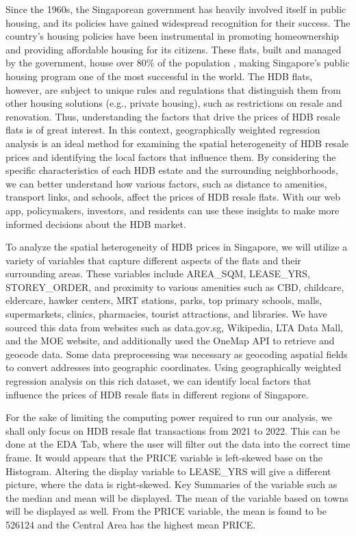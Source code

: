 \documentclass[manuscript,screen]{acmart}
\begin{document}
Since the 1960s, the Singaporean government has heavily involved itself
in public housing, and its policies have gained widespread recognition
for their success. The country's housing policies have been instrumental
in promoting homeownership and providing affordable housing for its
citizens. These flats, built and managed by the government, house over
80\% of the population \citep{Harsh22}, making Singapore's public
housing program one of the most successful in the world. The HDB flats,
however, are subject to unique rules and regulations that distinguish
them from other housing solutions (e.g., private housing), such as
restrictions on resale and renovation. Thus, understanding the factors
that drive the prices of HDB resale flats is of great interest. In this
context, geographically weighted regression analysis is an ideal method
for examining the spatial heterogeneity of HDB resale prices and
identifying the local factors that influence them. By considering the
specific characteristics of each HDB estate and the surrounding
neighborhoods, we can better understand how various factors, such as
distance to amenities, transport links, and schools, affect the prices
of HDB resale flats. With our web app, policymakers, investors, and
residents can use these insights to make more informed decisions about
the HDB market.

To analyze the spatial heterogeneity of HDB prices in Singapore, we will
utilize a variety of variables that capture different aspects of the
flats and their surrounding areas. These variables include AREA\_SQM,
LEASE\_YRS, STOREY\_ORDER, and proximity to various amenities such as
CBD, childcare, eldercare, hawker centers, MRT stations, parks, top
primary schools, malls, supermarkets, clinics, pharmacies, tourist
attractions, and libraries. We have sourced this data from websites such
as data.gov.sg, Wikipedia, LTA Data Mall, and the MOE website, and
additionally used the OneMap API to retrieve and geocode data. Some data
preprocessing was necessary as geocoding aspatial fields to convert
addresses into geographic coordinates. Using geographically weighted
regression analysis on this rich dataset, we can identify local factors
that influence the prices of HDB resale flats in different regions of
Singapore.~

For the sake of limiting the computing power required to run our
analysis, we shall only focus on HDB resale flat transactions from 2021
to 2022. This can be done at the EDA Tab, where the user will filter out
the data into the correct time frame. It would appears that the PRICE
variable is left-skewed base on the Histogram. Altering the display
variable to LEASE\_YRS will give a different picture, where the data is
right-skewed. Key Summaries of the variable such as the median and mean
will be displayed. The mean of the variable based on towns will be
displayed as well. From the PRICE variable, the mean is found to be
526124 and the Central Area has the highest mean PRICE.
\end{document}
